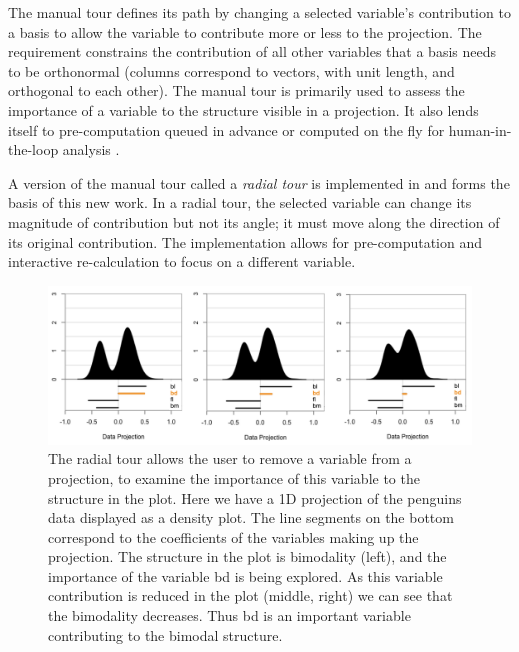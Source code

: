 \documentclass[
]{sn-jnl}
\begin{document}
The manual tour \citep{cook_manual_1997} defines its path by changing a
selected variable's contribution to a basis to allow the variable to
contribute more or less to the projection. The requirement constrains
the contribution of all other variables that a basis needs to be
orthonormal (columns correspond to vectors, with unit length, and
orthogonal to each other). The manual tour is primarily used to assess
the importance of a variable to the structure visible in a projection.
It also lends itself to pre-computation queued in advance or computed on
the fly for human-in-the-loop analysis
\citep{karwowski_international_2006}.

A version of the manual tour called a \emph{radial tour} is implemented
in \citet{spyrison_spinifex_2020} and forms the basis of this new work.
In a radial tour, the selected variable can change its magnitude of
contribution but not its angle; it must move along the direction of its
original contribution. The implementation allows for pre-computation and
interactive re-calculation to focus on a different variable.

\begin{CodeChunk}
\begin{figure}

{\centering \includegraphics[width=0.99\linewidth]{./figures/radial_tour} 

}

\caption{The radial tour allows the user to remove a variable from a projection, to examine the importance of this variable to the structure in the plot. Here we have a 1D projection of the penguins data displayed as a density plot. The line segments on the bottom correspond to the coefficients of the variables making up the projection. The structure in the plot is bimodality (left), and the importance of the variable \textsf{bd} is being explored. As this variable contribution is reduced in the plot (middle, right) we can see that the bimodality decreases. Thus \textsf{bd} is an important variable contributing to the bimodal structure.}\label{fig:radialtour}
\end{figure}
\end{CodeChunk}
\end{document}
